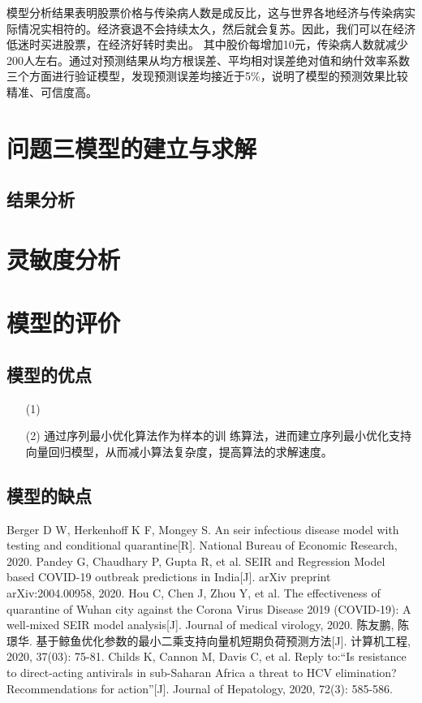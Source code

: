 \documentclass{whutmod}
\begin{document}
模型分析结果表明股票价格与传染病人数是成反比，这与世界各地经济与传染病实际情况实相符的。经济衰退不会持续太久，然后就会复苏。因此，我们可以在经济低迷时买进股票，在经济好转时卖出。 其中股价每增加10元，传染病人数就减少200人左右。通过对预测结果从均方根误差、平均相对误差绝对值和纳什效率系数三个方面进行验证模型，发现预测误差均接近于5\%，说明了模型的预测效果比较精准、可信度高。

	
    \section{问题三模型的建立与求解}
  		\subsection{结果分析}
  
  	\section{灵敏度分析}
 
  	\section{模型的评价}
		\subsection{模型的优点}
			\begin{itemize}                                             
			\item [(1)]
			\item [(2)]通过序列最小优化算法作为样本的训 练算法，进而建立序列最小优化支持向量回归模型，从而减小算法复杂度，提高算法的求解速度。
			
				
			\end{itemize}
		\subsection{模型的缺点}

  
 
	\newpage	%
	\nocite{*}		%
	\begin{thebibliography}{9}%
		Berger D W, Herkenhoff K F, Mongey S. An seir infectious disease model with testing and conditional quarantine[R]. National Bureau of Economic Research, 2020.
	Pandey G, Chaudhary P, Gupta R, et al. SEIR and Regression Model based COVID-19 outbreak predictions in India[J]. arXiv preprint arXiv:2004.00958, 2020.
	Hou C, Chen J, Zhou Y, et al. The effectiveness of quarantine of Wuhan city against the Corona Virus Disease 2019 (COVID‐19): A well‐mixed SEIR model analysis[J]. Journal of medical virology, 2020.
	陈友鹏, 陈璟华. 基于鲸鱼优化参数的最小二乘支持向量机短期负荷预测方法[J]. 计算机工程, 2020, 37(03): 75-81.
	Childs K, Cannon M, Davis C, et al. Reply to:“Is resistance to direct-acting antivirals in sub-Saharan Africa a threat to HCV elimination? Recommendations for action”[J]. Journal of Hepatology, 2020, 72(3): 585-586.
	\end{thebibliography}
\end{document}
